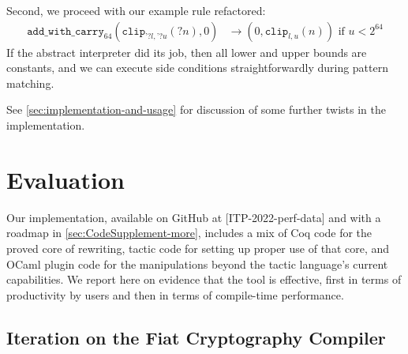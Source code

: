 \documentclass[a4paper,USenglish,cleveref,autoref,thm-restate]{lipics-v2021}
\begin{document}
Second, we proceed with our example rule refactored:
\begin{align*}
  \texttt{add\_with\_carry}_{64}(\texttt{clip}_{\texttt{'}{?l},\texttt{'}{?u}}({?n}), 0) & \to (0, \texttt{clip}_{l,u}(n)) %
  \text{\ \ if\ \ }u < 2^{64}
\end{align*}
If the abstract interpreter did its job, then all lower and upper bounds are constants, and we can execute side conditions straightforwardly during pattern matching.

See \autoref{sec:implementation-and-usage}
for discussion of some further twists in the implementation.

\section{Evaluation}\label{sec:evaluation}

Our implementation, available on GitHub at [ITP-2022-perf-data] and with a roadmap in \autoref{sec:CodeSupplement-more}, includes a mix of Coq code for the proved core of rewriting, tactic code for setting up proper use of that core, and OCaml plugin code for the manipulations beyond the tactic language's current capabilities.
We report here on evidence that the tool is effective, first in terms of productivity by users and then in terms of compile-time performance.

\subsection{Iteration on the Fiat Cryptography Compiler}\label{sec:iteration}
\end{document}
